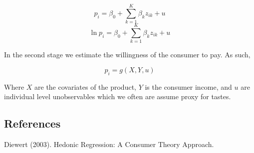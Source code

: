 \documentclass[twoside]{article}
\begin{document}
\begin{equation}\label{eq:lin_assump}
p_i  = \beta_0 + \sum^K_{k=1}\beta_kz_{ik} + u
\end{equation}
\begin{equation}\label{eq:log_assump}
\ln p_i  = \beta_0 + \sum^K_{k=1}\beta_kz_{ik} + u
\end{equation}

In the second stage we estimate the willingness of the consumer to pay. As such,

$$p_i = g(X, Y, u)$$

Where $X$ are the covariates of the product, $Y$ is the consumer income, and $u$ are individual level unobservables which we often are assume proxy for tastes.


\subsection{References}

Diewert (2003). Hedonic Regression: A Consumer Theory Approach.



\end{document}
